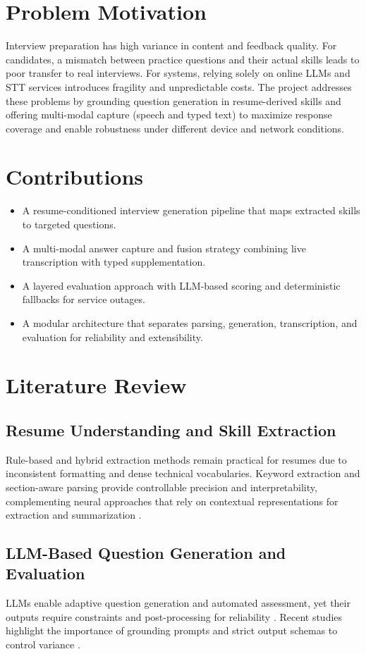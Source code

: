 \documentclass[conference]{IEEEtran}
\begin{document}
\section{Problem Motivation}
Interview preparation has high variance in content and feedback quality. For candidates, a mismatch between practice questions and their actual skills leads to poor transfer to real interviews. For systems, relying solely on online LLMs and STT services introduces fragility and unpredictable costs. The project addresses these problems by grounding question generation in resume-derived skills and offering multi-modal capture (speech and typed text) to maximize response coverage and enable robustness under different device and network conditions.

\section{Contributions}
\begin{itemize}
\item A resume-conditioned interview generation pipeline that maps extracted skills to targeted questions.
\item A multi-modal answer capture and fusion strategy combining live transcription with typed supplementation.
\item A layered evaluation approach with LLM-based scoring and deterministic fallbacks for service outages.
\item A modular architecture that separates parsing, generation, transcription, and evaluation for reliability and extensibility.
\end{itemize}

\section{Literature Review}
\subsection{Resume Understanding and Skill Extraction}
Rule-based and hybrid extraction methods remain practical for resumes due to inconsistent formatting and dense technical vocabularies. Keyword extraction and section-aware parsing provide controllable precision and interpretability, complementing neural approaches that rely on contextual representations for extraction and summarization \cite{peters2018deep,devlin2019bert,liu2019bertsum}.

\subsection{LLM-Based Question Generation and Evaluation}
LLMs enable adaptive question generation and automated assessment, yet their outputs require constraints and post-processing for reliability \cite{brown2020language,raffel2020t5,openai2023gpt4}. Recent studies highlight the importance of grounding prompts and strict output schemas to control variance \cite{wei2022chain}.
\end{document}
